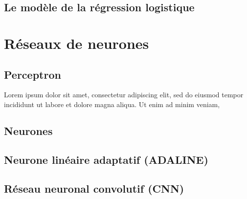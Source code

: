 	\subsection{Le modèle de la régression logistique }
		\lipsum[1]
		
	
	
	\section{Réseaux de neurones}
	\subsection{Perceptron}
	Lorem ipsum dolor sit amet, consectetur adipiscing elit, sed do eiusmod tempor incididunt ut labore et dolore magna aliqua. Ut enim ad minim veniam,
	\subsection{Neurones}
	\lipsum[1]
	\subsection{Neurone linéaire adaptatif (ADALINE)}
	\lipsum[1]
	\subsection{Réseau neuronal convolutif (CNN)}
	\lipsum[1]
		
